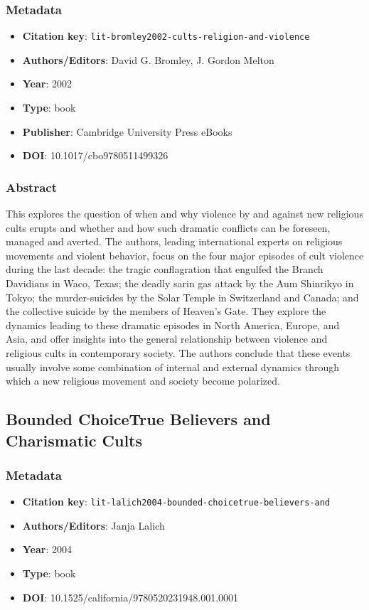 \subsubsection*{Metadata}
\begin{itemize}
  \item \textbf{Citation key}: \texttt{lit-bromley2002-cults-religion-and-violence}
  \item \textbf{Authors/Editors}: David G. Bromley, J. Gordon Melton
  \item \textbf{Year}: 2002
  \item \textbf{Type}: book
  \item \textbf{Publisher}: Cambridge University Press eBooks
  \item \textbf{DOI}: 10.1017/cbo9780511499326
\end{itemize}
\subsubsection*{Abstract}
This explores the question of when and why violence by and against new religious cults erupts and whether and how such dramatic conflicts can be foreseen, managed and averted. The authors, leading international experts on religious movements and violent behavior, focus on the four major episodes of cult violence during the last decade: the tragic conflagration that engulfed the Branch Davidians in Waco, Texas; the deadly sarin gas attack by the Aum Shinrikyo in Tokyo; the murder-suicides by the Solar Temple in Switzerland and Canada; and the collective suicide by the members of Heaven's Gate. They explore the dynamics leading to these dramatic episodes in North America, Europe, and Asia, and offer insights into the general relationship between violence and religious cults in contemporary society. The authors conclude that these events usually involve some combination of internal and external dynamics through which a new religious movement and society become polarized.

\subsection{Bounded ChoiceTrue Believers and Charismatic Cults}\label{lit:lit-lalich2004-bounded-choicetrue-believers-and}
\subsubsection*{Metadata}
\begin{itemize}
  \item \textbf{Citation key}: \texttt{lit-lalich2004-bounded-choicetrue-believers-and}
  \item \textbf{Authors/Editors}: Janja Lalich
  \item \textbf{Year}: 2004
  \item \textbf{Type}: book
  \item \textbf{DOI}: 10.1525/california/9780520231948.001.0001
\end{itemize}
